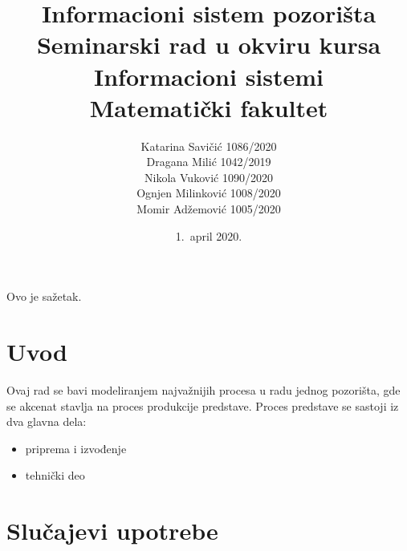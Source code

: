 \documentclass[a4paper]{article}
\begin{document}
\title{Informacioni sistem pozorišta\\ \small{Seminarski rad u okviru kursa\\Informacioni sistemi\\ Matematički fakultet}}

\author{
Katarina Savičić 1086/2020\\
Dragana Milić 1042/2019\\
Nikola Vuković 1090/2020\\
Ognjen Milinković 1008/2020\\
Momir Adžemović 1005/2020
}

\date{1.~april 2020.}

\maketitle

\abstract

Ovo je sažetak.

\newpage

\tableofcontents

\newpage

\section{Uvod}
Ovaj rad se bavi modeliranjem najvažnijih procesa u radu jednog pozorišta, gde se akcenat
stavlja na proces produkcije predstave. Proces predstave se sastoji iz dva glavna 
dela:\cite{hamilton_theatre_producing_the_drama}
\begin{itemize}
  \item priprema i izvođenje
  \item tehnički deo
\end{itemize}

\section{Slučajevi upotrebe}
\end{document}
